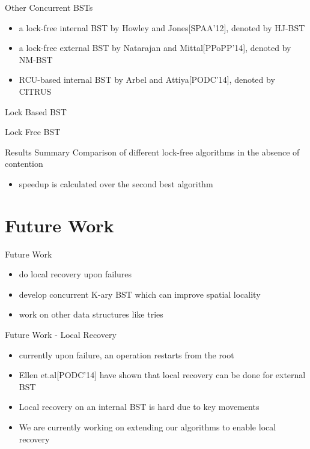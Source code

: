 \documentclass{beamer}
\begin{document}
\begin{frame}{Other Concurrent BSTs}
\begin{itemize}
\item a lock-free internal BST by Howley and Jones[SPAA'12], denoted by HJ-BST
\item a lock-free external BST by Natarajan and Mittal[PPoPP'14], denoted by NM-BST
\item RCU-based internal BST by Arbel and Attiya[PODC'14], denoted by CITRUS 
\end{itemize}
\end{frame}

\begin{frame}{Lock Based BST}

\end{frame}

\begin{frame}{Lock Free BST}

\end{frame}

\begin{frame}{Results Summary}
Comparison of different lock-free algorithms in the absence of contention

\pause
\begin{itemize}
\item speedup is calculated over the second best algorithm
\end{itemize}

\end{frame}

\section{Future Work}
\begin{frame}{Future Work}
\begin{itemize}
\item do local recovery upon failures
\item develop concurrent K-ary BST which can improve spatial locality
\item work on other data structures like tries
\end{itemize}
\end{frame}

\begin{frame}{Future Work - Local Recovery}
\begin{itemize}
\item currently upon failure, an operation restarts from the root
\item Ellen et.al[PODC'14] have shown that local recovery can be done for external BST
\item Local recovery on an internal BST is hard due to key movements
\item We are currently working on extending our algorithms to enable local recovery
\end{itemize}
\end{frame}
\end{document}
